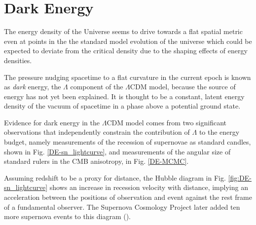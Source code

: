 \documentclass{paper}
\begin{document}
\section*{Dark Energy}
  The energy density of the Universe seems to drive towards
  a flat spatial metric even at points in the
  the standard model evolution of the universe which could be expected
  to deviate from the critical density due to the shaping effects of 
  energy densities.

  The pressure nudging spacetime to a flat curvature in the current epoch is 
  known as \textit{dark} energy, the $\Lambda$ component of the $\Lambda$CDM
  model, because the source of energy has not yet been explained. 
  It is thought to be a constant, latent energy density of the vacuum of 
  spacetime in a phase above a potential ground state.

  Evidence for dark energy in the $\Lambda$CDM model comes from two 
  significant observations that independently constrain the contribution of 
  $\Lambda$ to the energy budget, namely measurements of the recession of 
  supernovae as standard candles, shown in Fig. \ref{DE-sn_lightcurve}, and 
  measurements of the angular size of 
  standard rulers in the CMB anisotropy, in Fig. \ref{DE-MCMC}.

  Assuming redshift to be a proxy for
  distance, the Hubble diagram in Fig. \ref{fig:DE-sn_lightcurve} shows an 
  increase in recession 
  velocity with distance, implying an acceleration between
  the positions of observation and event against the rest frame of a
  fundamental observer. The Supernova Cosmology Project later
  added ten more supernova events to this diagram 
  (\cite{2012ApJ...746...85S}).
\end{document}
